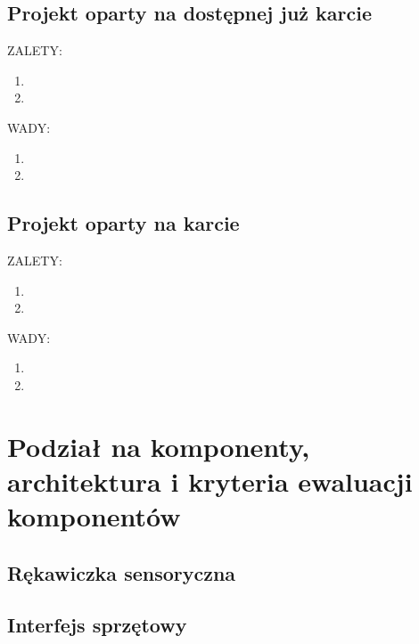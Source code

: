 \documentclass{article}
\begin{document}
\subsection{Projekt oparty na dostępnej już karcie }
ZALETY:\\
\begin{enumerate}
    \item 
    \item 
\end{enumerate}
WADY:\\
\begin{enumerate}
    \item 
    \item 
\end{enumerate}
\subsection{Projekt oparty na karcie }
ZALETY:\\
\begin{enumerate}
    \item 
    \item 
\end{enumerate}
WADY:\\
\begin{enumerate}
    \item 
    \item 
\end{enumerate}
\section{Podział na komponenty, architektura i kryteria ewaluacji komponentów}
\subsection{Rękawiczka sensoryczna}
\subsection{Interfejs sprzętowy}
\end{document}
